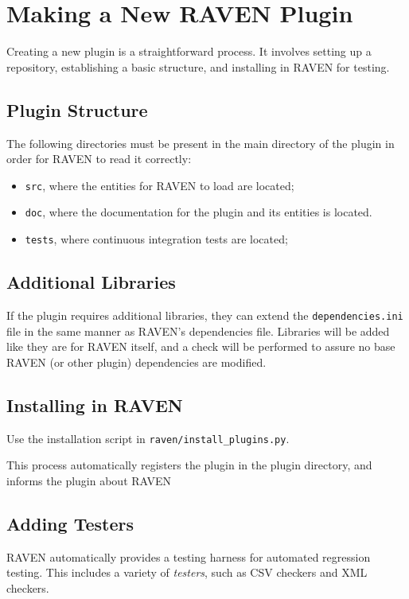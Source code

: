 \section{Making a New RAVEN Plugin}

Creating a new plugin is a straightforward process. It involves setting up a repository,
establishing a basic structure, and installing in RAVEN for testing.


\subsection{Plugin Structure}
The following directories must be present in the main directory of the plugin in order for RAVEN to
read it correctly:
\begin{itemize}
  \item \texttt{src}, where the entities for RAVEN to load are located;
  \item \texttt{doc}, where the documentation for the plugin and its entities is located.
  \item \texttt{tests}, where continuous integration tests are located;
\end{itemize}

\subsection{Additional Libraries}
If the plugin requires additional libraries, they can extend the \texttt{dependencies.ini} file in
the same manner as RAVEN's dependencies file. Libraries will be added like they are for RAVEN
itself, and a check will be performed to assure no base RAVEN (or other plugin) dependencies are
modified.

\subsection{Installing in RAVEN}
Use the installation script in \texttt{raven/install\_plugins.py}.

This process automatically registers the plugin in the plugin directory, and informs the plugin
about RAVEN %

\subsection{Adding Testers}
RAVEN automatically provides a testing harness for automated regression testing. This includes a
variety of \emph{testers}, such as CSV checkers and XML checkers.

